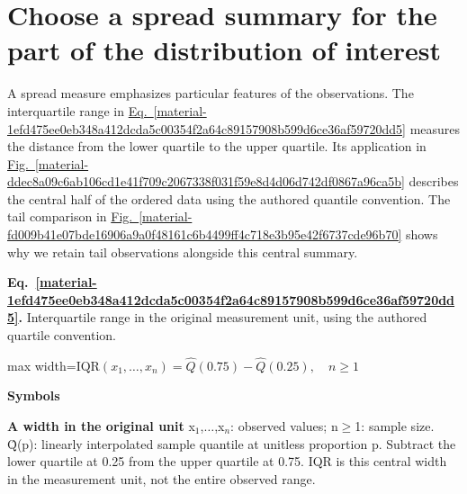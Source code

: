 \documentclass[11pt,a4paper]{article}
\begin{document}
\medskip

\clearpage
\section{Choose a spread summary for the part of the distribution of interest}
A spread measure emphasizes particular features of the observations. The interquartile range in \hyperref[material-1efd475ee0eb348a412dcda5c00354f2a64c89157908b599d6ce36af59720dd5]{Eq.~\ref*{material-1efd475ee0eb348a412dcda5c00354f2a64c89157908b599d6ce36af59720dd5}} measures the distance from the lower quartile to the upper quartile. Its application in \hyperref[material-ddec8a09c6ab106cd1e41f709c2067338f031f59e8d4d06d742df0867a96ca5b]{Fig.~\ref*{material-ddec8a09c6ab106cd1e41f709c2067338f031f59e8d4d06d742df0867a96ca5b}} describes the central half of the ordered data using the authored quantile convention. The tail comparison in \hyperref[material-fd009b41e07bde16906a9a0f48161c6b4499ff4c718e3b95e42f6737cde96b70]{Fig.~\ref*{material-fd009b41e07bde16906a9a0f48161c6b4499ff4c718e3b95e42f6737cde96b70}} shows why we retain tail observations alongside this central summary.


\par\medskip
\begin{samepage}
\label{material-1efd475ee0eb348a412dcda5c00354f2a64c89157908b599d6ce36af59720dd5}
\noindent\textbf{Eq.~\ref*{material-1efd475ee0eb348a412dcda5c00354f2a64c89157908b599d6ce36af59720dd5}.} Interquartile range in the original measurement unit, using the authored quartile convention.\par\nopagebreak
\begin{center}\begin{adjustbox}{max width=\linewidth}$\displaystyle \mathrm{IQR}(x_1,\ldots,x_n)=\widehat Q(0.75)-\widehat Q(0.25),\quad n\ge1$\end{adjustbox}\end{center}

\par\noindent\textbf{Symbols}

\par\noindent\textbf{A width in the original unit} x\ensuremath{{}_1},\ensuremath{\ldots},x\ensuremath{{}_n}: observed values; n\ensuremath{\ge}1: sample size. Q̂(p): linearly interpolated sample quantile at unitless proportion p. Subtract the lower quartile at 0.25 from the upper quartile at 0.75. IQR is this central width in the measurement unit, not the entire observed range.

\end{samepage}
\medskip
\end{document}
